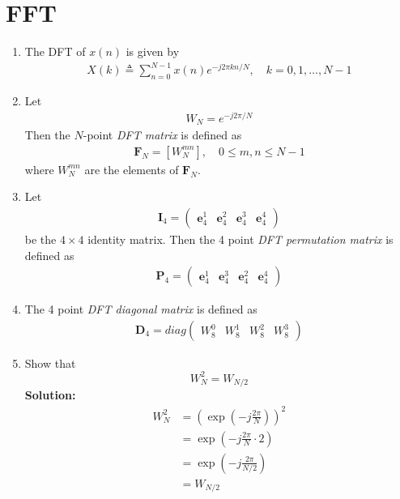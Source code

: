 \documentclass[journal,12pt,twocolumn]{IEEEtran}
\newcommand{\myvec}[1]{\ensuremath{\begin{pmatrix}#1\end{pmatrix}}}
\newcommand{\solution}{\noindent \textbf{Solution: }}
\providecommand{\brak}[1]{\ensuremath{\left(#1\right)}}
\providecommand{\sbrak}[1]{\ensuremath{\left[#1\right]}}
\let\vec\mathbf
\numberwithin{equation}{section}
\renewcommand\thesection{\arabic{section}}
\newcommand{\myvec}[1]{\ensuremath{\begin{pmatrix}#1\end{pmatrix}}}
\renewcommand\thesection{\arabic{section}}
\begin{document}
\section{FFT}
\begin{enumerate}[label=\arabic*.,ref=\thesection.\theenumi]
    \item The DFT of $x(n)$ is given by
    \begin{align}
        X(k) \triangleq \sum_{n=0}^{N-1} x(n) e^{-j 2 \pi k n / N}, \quad k=0,1, \ldots, N-1
    \end{align}
\item Let 
	\begin{align}
W_{N} = e^{-j2\pi/N} 
	\end{align}
		Then the $N$-point {\em DFT matrix} is defined as 
	\begin{align}
		\vec{F}_{N} = \sbrak{W_{N}^{mn}}, \quad 0 \le m,n \le N-1 
	\end{align}
	where $W_{N}^{mn}$ are the elements of $\vec{F}_{N}$.
\item Let 
	\begin{align}
		\vec{I}_4 = \myvec{\vec{e}_4^{1} &\vec{e}_4^{2} &\vec{e}_4^{3} &\vec{e}_4^{4} }
	\end{align}
		be the $4\times 4$ identity matrix.  Then the 4 point {\em DFT permutation matrix} is defined as 
	\begin{align}
		\vec{P}_4 = \myvec{\vec{e}_4^{1} &\vec{e}_4^{3} &\vec{e}_4^{2} &\vec{e}_4^{4} }
	\end{align}
\item The 4 point {\em DFT diagonal matrix} is defined as 
	\begin{align}
		\vec{D}_4 = diag\myvec{W_{8}^{0} & W_{8}^{1} & W_{8}^{2} & W_{8}^{3}}
	\end{align}
\item Show that 
\begin{equation}
    W_{N}^{2}=W_{N/2}
\end{equation}
\solution
	\begin{align}
		W_N^2 &= \brak{\exp\brak{-j\frac{2\pi}{N}}}^2	 \\
		&= \exp\brak{-j\frac{2\pi}{N} \cdot 2} \\
		&= \exp\brak{-j\frac{2\pi}{N/2}} \\
		&= W_{N/2}
	\end{align}	 

\end{enumerate}
\end{document}
